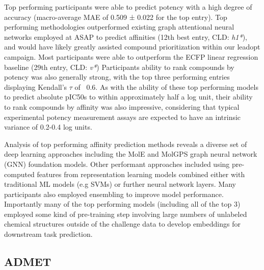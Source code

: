 \documentclass[journal=jcim,manuscript=article]{achemso}
\begin{document}
Top performing participants were able to predict potency with a high degree of accuracy (macro-average MAE of 0.509 ± 0.022 for the top entry). Top performing methodologies outperformed existing graph attentional neural networks employed at ASAP to predict affinities (12th best entry, CLD: \textit{h1*}), and would have likely greatly assisted compound prioritization within our leadopt campaign. Most participants were able to outperform the ECFP linear regression baseline (29th entry, CLD: \textit{v*}) Participants ability to rank compounds by potency was also generally strong, with the top three performing entries displaying Kendall's $\tau$  of ~0.6. As with the ability of these top performing models to predict absolute pIC50s to within approximately half a log unit, their ability to rank compounds by affinity was also impressive, considering that typical experimental potency measurement assays are expected to have an intrinsic variance of 0.2-0.4 log units.

Analysis of top performing affinity prediction methods reveals a diverse set of deep learning approaches including the MolE and MolGPS graph neural network (GNN) foundation models. Other performant approaches included using pre-computed features from representation learning models combined either with traditional ML models (e.g SVMs) or further neural network layers. Many participants also employed ensembling to improve model performance.  Importantly many of the top performing models (including all of the top 3) employed some kind of pre-training step involving large numbers of unlabeled chemical structures outside of the challenge data to develop embeddings for downstream task prediction.


\subsection{ADMET}
\end{document}
